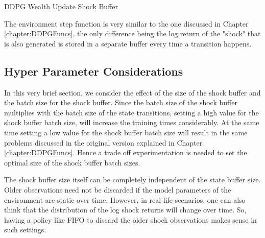 \begin{breakablealgorithm}
\caption{DDPG Wealth Update Shock Buffer}\label{alg:ddpg_shock_buffer_update_wu}
\end{breakablealgorithm}
The environment step function is very similar to the one discussed in Chapter \ref{chapter:DDPGFuncs}, the only difference being the log return of the "shock" that is also generated is stored in a separate buffer every time a transition happens.

\subsection{Hyper Parameter Considerations}
In this very brief section, we consider the effect of the size of the shock buffer and the batch size for the shock buffer. Since the batch size of the shock buffer multiplies with the batch size of the state transitions, setting a high value for the shock buffer batch size, will increase the training times considerably. At the same time setting a low value for the shock buffer batch size will result in the same problems discussed in the original version explained in Chapter \ref{chapter:DDPGFuncs}. Hence a trade off experimentation is needed to set the optimal size of the shock buffer batch sizes.

The shock buffer size itself can be completely independent of the state buffer size. Older observations need not be discarded if the model parameters of the environment are static over time. However, in real-life scenarios, one can also think that the distribution of the log shock returns will change over time. So, having a policy like FIFO to discard the older shock observations makes sense in such settings.














